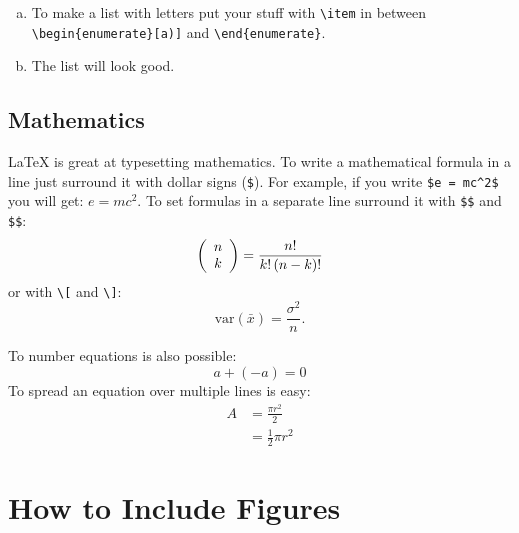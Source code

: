 \documentclass[12pt,final,a4paper,oneside]{book}
\begin{document}
\begin{enumerate}[a)]
	\item To make a list with letters put your stuff with \verb*|\item| in between \verb*|\begin{enumerate}[a)]| and \verb*|\end{enumerate}|. 
	\item The list will look good.	
\end{enumerate}
	
	
\subsection{Mathematics}
	
\LaTeX{} is great at typesetting mathematics.
To write a mathematical formula in a line just surround it with dollar signs (\verb*|$|). For example, if you write \verb|$e = mc^2$| you will get:  $e = mc^2$.
To set formulas in a separate line surround it with \verb*|$$| and \verb*|$$|:
$$ 
\left( {\begin{array}{*{20}c}
		n  \\
		k  \\
\end{array}} \right) = \frac{{n!}}{{k!\left( {n - k} \right)!}}
$$
or with \verb*|\[| and \verb*|\]|:
\[
	\text{var}(\bar x) = \frac{{\sigma ^2 }}{n}.
\]

To number equations is also possible:
\begin{equation}\label{eq:greatmath}
	a + (-a) = 0
\end{equation}
To spread an equation over multiple lines is easy:
\begin{align}
	A & = \frac{\pi r^2}{2} \\
	& = \frac{1}{2} \pi r^2
\end{align}


	
	
\section{How to Include Figures}
	
\end{document}
